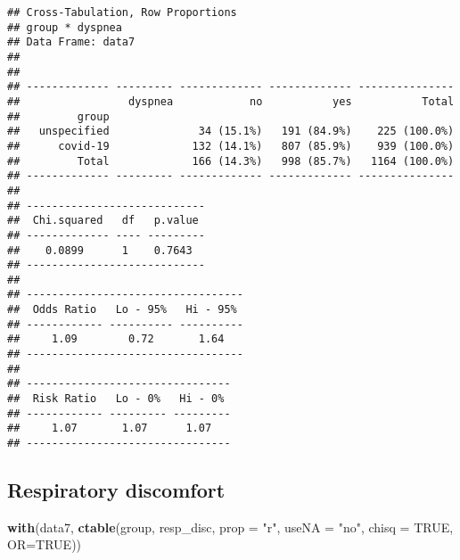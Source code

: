 \documentclass[
]{article}
\newenvironment{Shaded}{\begin{snugshade}}{\end{snugshade}}
\newcommand{\DataTypeTok}[1]{\textcolor[rgb]{0.13,0.29,0.53}{#1}}
\newcommand{\KeywordTok}[1]{\textcolor[rgb]{0.13,0.29,0.53}{\textbf{#1}}}
\newcommand{\NormalTok}[1]{#1}
\newcommand{\OtherTok}[1]{\textcolor[rgb]{0.56,0.35,0.01}{#1}}
\newcommand{\StringTok}[1]{\textcolor[rgb]{0.31,0.60,0.02}{#1}}
\begin{document}
\begin{verbatim}
## Cross-Tabulation, Row Proportions  
## group * dyspnea  
## Data Frame: data7  
## 
## 
## ------------- --------- ------------- ------------- ---------------
##                 dyspnea            no           yes           Total
##         group                                                      
##   unspecified              34 (15.1%)   191 (84.9%)    225 (100.0%)
##      covid-19             132 (14.1%)   807 (85.9%)    939 (100.0%)
##         Total             166 (14.3%)   998 (85.7%)   1164 (100.0%)
## ------------- --------- ------------- ------------- ---------------
## 
## ----------------------------
##  Chi.squared   df   p.value 
## ------------- ---- ---------
##    0.0899      1    0.7643  
## ----------------------------
## 
## ----------------------------------
##  Odds Ratio   Lo - 95%   Hi - 95% 
## ------------ ---------- ----------
##     1.09        0.72       1.64   
## ----------------------------------
## 
## --------------------------------
##  Risk Ratio   Lo - 0%   Hi - 0% 
## ------------ --------- ---------
##     1.07       1.07      1.07   
## --------------------------------
\end{verbatim}

\hypertarget{respiratory-discomfort}{%
\subsection{Respiratory discomfort}\label{respiratory-discomfort}}

\begin{Shaded}
\begin{Highlighting}[]
\KeywordTok{with}\NormalTok{(data7, }\KeywordTok{ctable}\NormalTok{(group, resp_disc, }\DataTypeTok{prop =} \StringTok{"r"}\NormalTok{, }\DataTypeTok{useNA =} \StringTok{"no"}\NormalTok{, }\DataTypeTok{chisq =} \OtherTok{TRUE}\NormalTok{, }\DataTypeTok{OR=}\OtherTok{TRUE}\NormalTok{))}
\end{Highlighting}
\end{Shaded}
\end{document}
